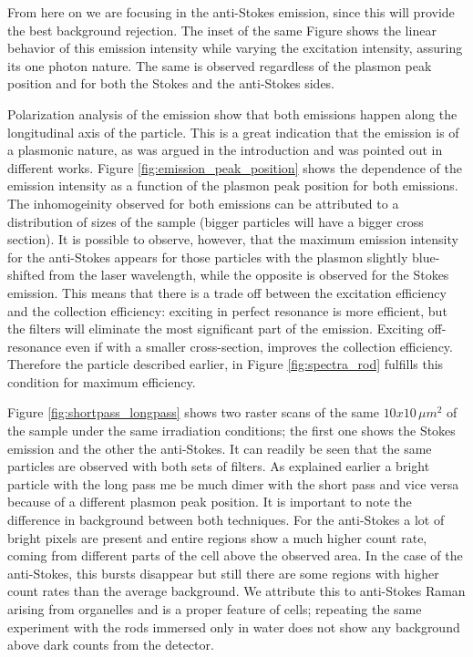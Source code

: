 \documentclass[twocolumn]{article}
\begin{document}
From here on we are focusing in the anti-Stokes emission, since this will
provide the best background rejection. The inset of the same Figure shows the
linear behavior of this emission intensity while varying the excitation
intensity, assuring its one photon nature. The same is observed regardless of
the plasmon peak position and for both the Stokes and the anti-Stokes sides.

Polarization analysis of the emission show that both emissions happen along the
longitudinal axis of the particle. This is a great indication that the emission
is of a plasmonic nature, as was argued in the introduction and was pointed out
in different works. Figure \ref{fig:emission_peak_position} shows the dependence
of the emission intensity as a function of the plasmon peak position for both
emissions. The inhomogeinity observed for both emissions can be attributed to a
distribution of sizes of the sample (bigger particles will have a bigger cross
section). It is possible to observe, however, that the maximum emission
intensity for the anti-Stokes appears for those particles with the plasmon
slightly blue-shifted from the laser wavelength, while the opposite is observed
for the Stokes emission. This means that there is a trade off between the
excitation efficiency and the collection efficiency: exciting in perfect
resonance is more efficient, but the filters will eliminate the most significant
part of the emission. Exciting off-resonance even if with a smaller
cross-section, improves the collection efficiency. Therefore the particle
described earlier, in Figure \ref{fig:spectra_rod} fulfills this condition for
maximum efficiency. 

Figure \ref{fig:shortpass_longpass} shows two raster scans of the same
$10x10\,\mu m^2$ of the sample under the same irradiation conditions; the first
one shows the Stokes emission and the other the anti-Stokes. It can readily be
seen that the same particles are observed with both sets of filters.
As explained earlier a bright particle with the long pass me be much dimer with
the short pass and vice versa because of a different plasmon peak position. It
is important to note the difference in background between both techniques. For
the anti-Stokes a lot of bright pixels are present and entire regions show a
much higher count rate, coming from different parts of the cell above the
observed area. In the case of the anti-Stokes, this bursts disappear but still
there are some regions with higher count rates than the average background.  We
attribute this to anti-Stokes Raman arising from organelles and is a proper
feature of cells; repeating the same experiment with the rods immersed only in
water does not show any background above dark counts from the detector.
\end{document}
